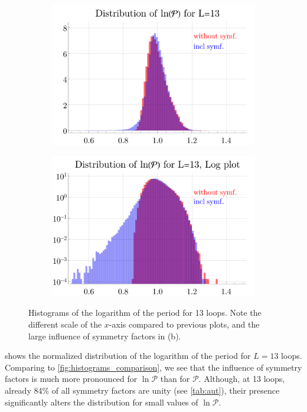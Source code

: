 \documentclass[11pt,a4paper]{article}
\newcommand{\period}{\mathcal P}
\renewcommand{\|}{\rule[-0.4ex]{0.2ex}{1.2em}}
\begin{document}
\begin{figure}[htbp]
	\centering
	\begin{subfigure}[b]{.48 \textwidth}
		\includegraphics[width=\linewidth]{distribution_P_13_log}
		\subcaption{}
	\end{subfigure}
	\begin{subfigure}[b]{.48 \textwidth}
		\includegraphics[width=\linewidth]{distribution_P_13_log_log}
		\subcaption{}
	\end{subfigure}
	
	\caption{Histograms of the logarithm of the period for 13 loops. Note the different scale of the $x$-axis compared to previous plots, and the large influence of symmetry factors in (b). }
	\label{fig:histograms_logP}
\end{figure}


 shows the normalized distribution of the logarithm of the period for $L=13$ loops. Comparing to   \cref{fig:histograms_comparison}, we see that the influence of symmetry factors is much more pronounced for $\ln \period$ than for $\period$.  Although, at 13 loops, already 84\% of all symmetry factors are unity (see \cref{tab:aut}), their presence significantly alters the distribution for small values of $\ln \period $. 
\end{document}
